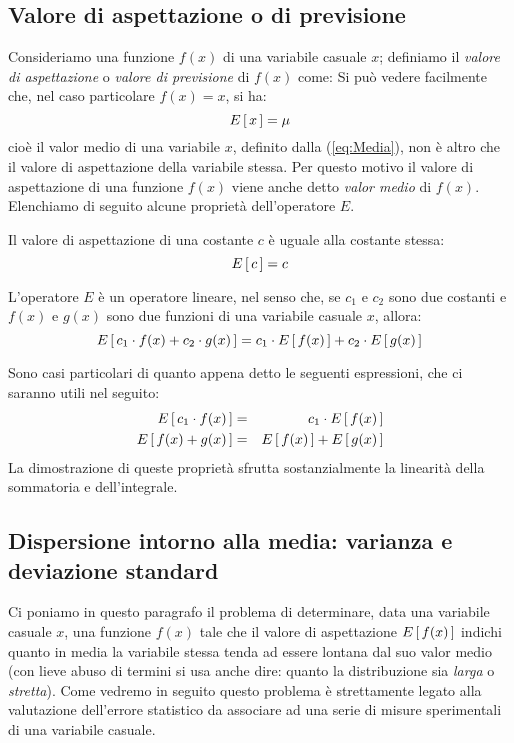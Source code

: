 \subsection{Valore di aspettazione o di previsione}

Consideriamo una funzione $f(x)$ di una variabile casuale $x$;
definiamo il {\itshape valore di aspettazione} o {\itshape valore
di previsione} di $f(x)$ come:
Si pu\`o vedere facilmente che, nel caso particolare $f(x)=x$, si ha:
$$
\displaystyle E\left[\, x \, \right] = \mu
$$
cio\`e il valor medio di una variabile $x$, definito dalla (\ref{eq:Media}),
non \`e altro che il valore di aspettazione della variabile stessa.
Per questo motivo il valore di aspettazione di una funzione $f(x)$ viene
anche detto {\itshape valor medio} di $f(x)$.
Elenchiamo di seguito alcune propriet\`a dell'operatore $E$.
\begin{numlist}
\item{Il valore di aspettazione di una costante $c$ \`e uguale alla costante
stessa:
$$
\displaystyle E\left[\, c \, \right]= c
$$
}
\item{L'operatore $E$ \`e un operatore lineare, nel senso che, se $c_1$ e $c_2$
sono due costanti e $f(x)$ e $g(x)$ sono due funzioni di una variabile
casuale $x$, allora:
$$
\displaystyle E\left[\, c_1\cdot f(x) + c_2\cdot g(x) \, \right] =
c_1\cdot \displaystyle E\left[\, f(x) \, \right] + c_2\cdot \displaystyle E\left[\, g(x) \, \right]
$$
}
\end{numlist}
Sono casi particolari di quanto appena detto le seguenti espressioni,
che ci saranno utili nel seguito:
\begin{eqnarray*}
\displaystyle E\left[\, c_1 \cdot f(x) \, \right] & = & c_1 \cdot \displaystyle E\left[\, f(x) \, \right]\\
\displaystyle E\left[\, f(x) + g(x) \, \right]    & = & \displaystyle E\left[\, f(x) \, \right] + \displaystyle E\left[\, g(x) \, \right]
\end{eqnarray*}
La dimostrazione di queste propriet\`a sfrutta sostanzialmente
la linearit\`a della sommatoria e dell'integrale.


\subsection{Dispersione intorno alla media: varianza e deviazione standard}

Ci poniamo in questo paragrafo il problema di determinare, data una variabile
casuale $x$, una funzione $f(x)$ tale che il valore di aspettazione
$\displaystyle E\left[\, f(x) \, \right]$ indichi quanto in media la variabile stessa tenda ad essere
lontana dal suo valor medio (con lieve abuso di termini si usa anche
dire: quanto la distribuzione sia {\itshape larga} o {\itshape stretta}).
Come vedremo in seguito questo problema \`e strettamente legato alla
valutazione dell'errore statistico da associare ad una serie di misure
sperimentali di una variabile casuale.

